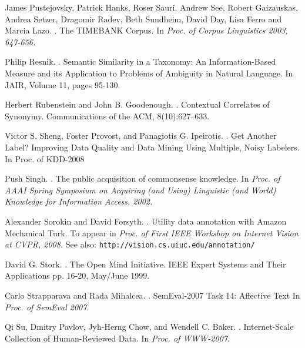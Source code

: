 \documentclass[11pt]{article}
\begin{document}
\begin{thebibliography}{}
James Pustejovsky, Patrick Hanks, Roser Saurí, Andrew See, Robert Gaizauskas, Andrea Setzer, Dragomir Radev, Beth Sundheim, David Day, Lisa Ferro and Marcia Lazo.
.
\newblock The TIMEBANK Corpus. 
\newblock In \textit{Proc. of Corpus Linguistics 2003, 647-656.}

Philip Resnik. 
.
\newblock Semantic Similarity in a Taxonomy: An Information-Based Measure and its Application to Problems of Ambiguity in Natural Language.
\newblock In JAIR, Volume 11, pages 95-130.

Herbert Rubenstein and John B. Goodenough.
.
\newblock Contextual Correlates of Synonymy.
\newblock Communications of the ACM, 8(10):627--633.

Victor S. Sheng, Foster Provost, and Panagiotis G. Ipeirotis.
.
\newblock Get Another Label? Improving Data Quality and Data Mining Using Multiple, Noisy Labelers.
\newblock In Proc. of KDD-2008

Push Singh.
. 
\newblock The public acquisition of commonsense knowledge.
\newblock In \textit{Proc. of AAAI Spring Symposium on Acquiring (and Using) Linguistic (and World) Knowledge for Information Access, 2002.}

Alexander Sorokin and David Forsyth.
. 
\newblock Utility data annotation with Amazon Mechanical Turk.
\newblock To appear in \textit{Proc. of  First IEEE Workshop on Internet Vision at CVPR, 2008.}
\newblock See also: \texttt{\scriptsize{http://vision.cs.uiuc.edu/annotation/}}

David G. Stork.
. 
\newblock The Open Mind Initiative.
\newblock IEEE Expert Systems and Their Applications pp. 16-20, May/June 1999.

Carlo Strapparava and Rada Mihalcea.
.
\newblock SemEval-2007 Task 14: Affective Text
\newblock In \textit{Proc. of SemEval 2007}.

Qi Su, Dmitry Pavlov, Jyh-Herng Chow, and Wendell C. Baker.
.
\newblock Internet-Scale Collection of Human-Reviewed Data. 
\newblock In \textit{Proc. of WWW-2007}.


\end{thebibliography}
\end{document}

